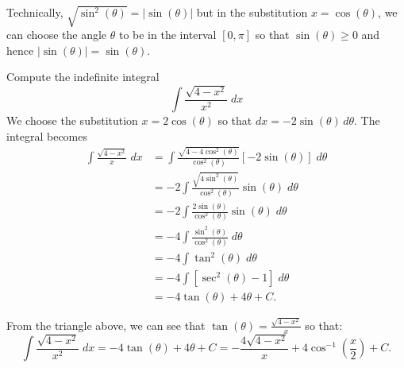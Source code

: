 \documentclass{ximera}
\begin{document}
\begin{remark}
Technically, $\sqrt{\sin^2(\theta)} = |\sin(\theta)|$ but in the substitution
$x = \cos(\theta)$, we can choose the angle $\theta$ to be in the interval
$[0, \pi]$ so that $\sin(\theta) \geq 0$ and hence $|\sin(\theta)| = \sin(\theta)$.
\end{remark}



\begin{example}
Compute the indefinite integral
\[
\int \frac{\sqrt{4-x^2}}{x^2} \; dx
\]
We choose the substitution $x = 2\cos(\theta)$ so that $dx = -2\sin(\theta) \, d\theta$.
The integral becomes
\begin{align*}
\int \frac{\sqrt{4-x^2}}{x} \; dx &= \int \frac{\sqrt{4-4\cos^2(\theta)}}{\cos^2(\theta)} [-2\sin(\theta)] \; d\theta\\
                                  &= -2\int \frac{\sqrt{4\sin^2(\theta)}}{\cos^2(\theta)}  \sin(\theta) \; d\theta\\
                                  &= -2\int \frac{2\sin(\theta)}{\cos^2(\theta)}  \sin(\theta) \; d\theta\\
 &= -4\int \frac{\sin^2(\theta)}{\cos^2(\theta)}  \; d\theta\\
 &= -4\int \tan^2(\theta)  \; d\theta\\
&= -4\int [\sec^2(\theta) - 1] \; d\theta\\
&= -4\tan(\theta) + 4\theta + C.
\end{align*}

From the triangle above, we can see that $\tan(\theta) = \frac{\sqrt{4-x^2}}{x}$ so that:
\[
\int \frac{\sqrt{4-x^2}}{x^2} \; dx = -4\tan(\theta) + 4\theta + C = -\frac{4\sqrt{4-x^2}}{x} + 4\cos^{-1}\left(\frac{x}{2}\right) + C. 
\]

\end{example}
\end{document}
